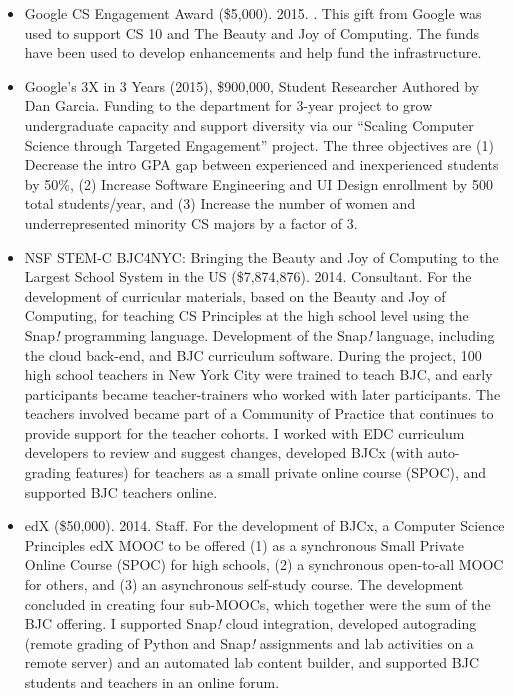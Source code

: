 \begin{itemize}
    \item{Google CS Engagement Award (\$5,000). 2015. \firstme.}
    \newline\small{This gift from Google was used to support CS 10 and The Beauty and Joy of Computing. The funds have been used to develop \snap enhancements and help fund the \snapcloud infrastructure.}
    
    \item{Google's 3X in 3 Years (2015), \$900,000, Student Researcher
    \newline
    Authored by Dan Garcia. Funding to the department for 3-year project to grow undergraduate capacity and support diversity via our ``Scaling Computer Science through Targeted Engagement'' project. The three objectives are (1) Decrease the intro GPA gap between experienced and inexperienced students by 50\%, (2) Increase Software Engineering and UI Design enrollment by 500 total students/year, and (3) Increase the number of women and underrepresented minority CS majors by a factor of 3.}
    
    \item{NSF STEM-C BJC4NYC: Bringing the Beauty and Joy of Computing to the Largest School System in the US (\$7,874,876). 2014. Consultant.}
    \newline\small{For the development of curricular materials, based on the Beauty and Joy of Computing, for teaching CS Principles at the high school level using the Snap\textit{!} programming language. Development of the Snap\textit{!} language, including the cloud back-end, and BJC curriculum software. During the project, 100 high school teachers in New York City were trained to teach BJC, and early participants became teacher-trainers who worked with later participants. The teachers involved became part of a Community of Practice that continues to provide support for the teacher cohorts. I worked with EDC curriculum developers to review and suggest changes, developed BJCx (with auto-grading features) for teachers as a small private online course (SPOC), and supported BJC teachers online.}
    
    \item{edX (\$50,000). 2014. Staff.}
    \newline\small{For the development of BJCx, a Computer Science Principles edX MOOC to be offered (1) as a synchronous Small Private Online Course (SPOC) for high schools, (2) a synchronous open-to-all MOOC for others, and (3) an asynchronous self-study course. The development concluded in creating four sub-MOOCs, which together were the sum of the BJC offering. I supported Snap\textit{!} cloud integration, developed autograding (remote grading of Python and Snap\textit{!} assignments and lab activities on a remote server) and an automated lab content builder, and supported BJC students and teachers in an online forum.}

\end{itemize}
